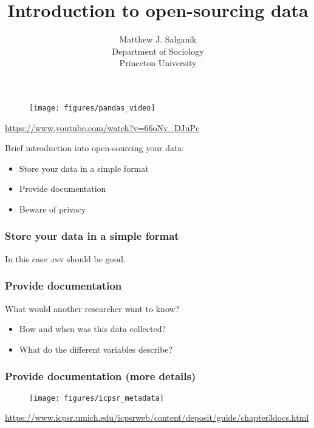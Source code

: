 \documentclass[aspectratio=169]{beamer}
\title[]{Introduction to open-sourcing data}
\author[]{Matthew J. Salganik\\Department of Sociology\\Princeton University}
\date[]{Summer Institute in Computational Social Science\\June 21, 2018
\vfill
\begin{flushleft}
{\scriptsize
The Summer Institute in Computational Social Science is supported by grants from the Russell Sage Foundation and the Alfred P. Sloan Foundation.}
\end{flushleft}
\begin{flushright}
\texttt{[image: figures/cc-by.png]}
\end{flushright}
}
\begin{document}
\frame{\titlepage}
\begin{frame}

\begin{figure}
  \centering
  \texttt{[image: figures/pandas\_video]}
\end{figure}

\url{https://www.youtube.com/watch?v=66oNv_DJuPc}

\end{frame}
\begin{frame}

Brief introduction into open-sourcing your data:
\begin{itemize}
\item Store your data in a simple format
\pause
\item Provide documentation
\pause
\item Beware of privacy
\end{itemize}

\end{frame}
\begin{frame}
\frametitle{Store your data in a simple format}

\pause
In this case .csv should be good.

\end{frame}
\begin{frame}
\frametitle{Provide documentation}

\pause
What would another researcher want to know? 

\begin{itemize}
\item How and when was this data collected?
\item What do the different variables describe?
\end{itemize}

\end{frame}
\begin{frame}
\frametitle{Provide documentation (more details)}

\begin{figure}
  \centering
  \texttt{[image: figures/icpsr\_metadata]}
\end{figure}

\vfill
\url{https://www.icpsr.umich.edu/icpsrweb/content/deposit/guide/chapter3docs.html}

\end{frame}
\end{document}
